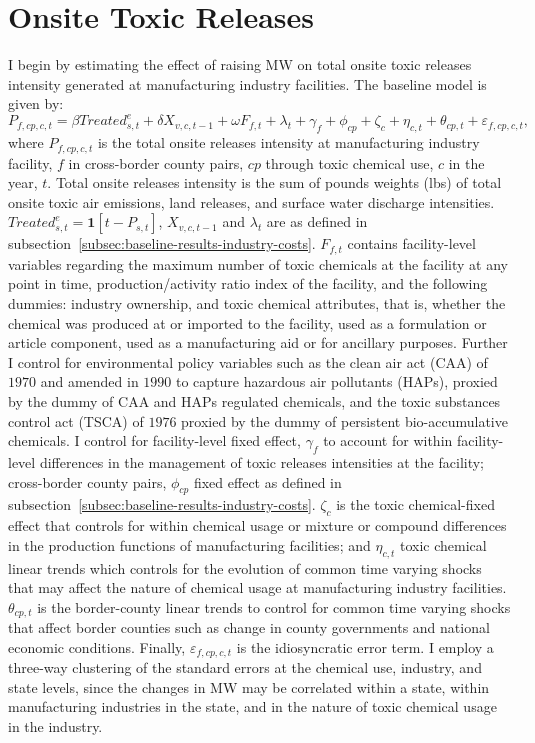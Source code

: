 \documentclass[12pt, english]{article}
\begin{document}
    \section{Onsite Toxic Releases}\label{sec:onsite-toxic-releases}
    I begin by estimating the effect of raising MW on total onsite toxic releases intensity generated at manufacturing industry facilities. The baseline model is given by:
    \begin{equation}
        P_{f,cp,c,t} = \beta Treated_{s,t}^e + \delta X_{v,c,t-1} + \omega F_{f,t} + \lambda_{t} + \gamma_{f} + \phi_{cp} + \zeta_{c} + \eta_{c,t} + \theta_{cp,t} + \varepsilon_{f,cp,c,t},\label{eq:baseline-total-onsite-releases-intensity}
    \end{equation}
    where $P_{f,cp,c,t}$ is the total onsite releases intensity at manufacturing industry facility, $f$ in cross-border county pairs, $cp$ through toxic chemical use, $c$ in the year, $t$. Total onsite releases intensity is the sum of pounds weights (lbs) of total onsite toxic air emissions, land releases, and surface water discharge intensities. $Treated_{s,t}^e = \textbf{1}[t - P_{s,t}]$, $X_{v,c,t-1}$ and $\lambda_{t}$ are as defined in subsection~\ref{subsec:baseline-results-industry-costs}. $F_{f,t}$ contains facility-level variables regarding the maximum number of toxic chemicals at the facility at any point in time, production/activity ratio index of the facility, and the following dummies: industry ownership, and toxic chemical attributes, that is, whether the chemical was produced at or imported to the facility, used as a formulation or article component, used as a manufacturing aid or for ancillary purposes. Further I control for environmental policy variables such as the clean air act (CAA) of $1970$ and amended in $1990$ to capture hazardous air pollutants (HAPs), proxied by the dummy of CAA and HAPs regulated chemicals, and the toxic substances control act (TSCA) of $1976$ proxied by the dummy of persistent bio-accumulative chemicals. I control for facility-level fixed effect, $\gamma_{f}$ to account for within facility-level differences in the management of toxic releases intensities at the facility; cross-border county pairs, $\phi_{cp}$ fixed effect as defined in subsection~\ref{subsec:baseline-results-industry-costs}. $\zeta_{c}$ is the toxic chemical-fixed effect that controls for within chemical usage or mixture or compound differences in the production functions of manufacturing facilities; and $\eta_{c,t}$ toxic chemical linear trends which controls for the evolution of common time varying shocks that may affect the nature of chemical usage at manufacturing industry facilities. $\theta_{cp,t}$ is the border-county linear trends to control for common time varying shocks that affect border counties such as change in county governments and national economic conditions. Finally, $\varepsilon_{f,cp,c,t}$ is the idiosyncratic error term. I employ a three-way clustering of the standard errors at the chemical use, industry, and state levels, since the changes in MW may be correlated within a state, within manufacturing industries in the state, and in the nature of toxic chemical usage in the industry.
    
\end{document}
